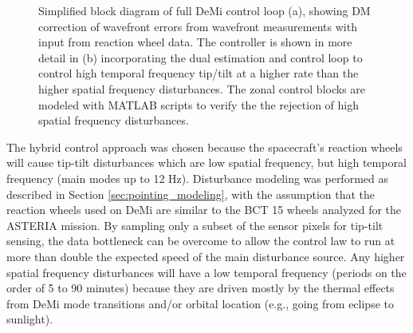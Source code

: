 \documentclass[]{spie}  %
\begin{document}
\begin{figure}[t]
\centering
{}

\smallskip
\caption{\label{fig:Dual_control_loop} Simplified block diagram of full DeMi control loop (a), showing DM correction of wavefront errors from wavefront measurements with input from reaction wheel data. The controller is shown in more detail in (b) incorporating  the dual estimation and control loop to control high temporal frequency tip/tilt at a higher rate than the higher spatial frequency disturbances. The zonal control blocks are modeled with MATLAB scripts to verify the the rejection of high spatial frequency disturbances.}
\end{figure}

The hybrid control approach was chosen because the spacecraft's reaction wheels will cause tip-tilt disturbances which are low spatial frequency, but high temporal frequency (main modes up to 12 Hz). Disturbance modeling was performed as described in Section \ref{sec:pointing_modeling}, with the assumption that the reaction wheels used on DeMi are similar to the BCT 15 wheels analyzed for the ASTERIA mission\cite{shields_characterization_2017}.  By sampling only a subset of the sensor pixels for tip-tilt sensing, the data bottleneck can be overcome to allow the control law to run at more than double the expected speed of the main disturbance source.  Any higher spatial frequency disturbances will have a low temporal frequency (periods on the order of 5 to 90 minutes) because they are driven mostly by the thermal effects from DeMi mode transitions and/or orbital location (e.g., going from eclipse to sunlight).
\end{document}
